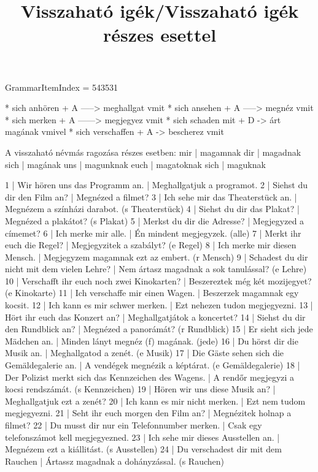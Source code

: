 \title{Visszaható igék/Visszaható igék részes esettel}

GrammarItemIndex = 543531

\begin{desc}
* sich anhören + A -----> meghallgat vmit
* sich ansehen + A -----> megnéz vmit
* sich merken + A ------> megjegyez vmit
* sich schaden mit + D -> árt magának vmivel
* sich verschaffen + A -> bescherez vmit

A visszaható névmás ragozása részes esetben:
mir  | magamnak
dir  | magadnak
sich | magának
uns  | magunknak
euch | magatoknak
sich | maguknak
\end{desc}

\begin{exmp}
1 | Wir hören uns das Programm an. | Meghallgatjuk a programot.
2 | Siehst du dir den Film an? | Megnézed a filmet?
3 | Ich sehe mir das Theaterstück an. | Megnézem a színházi darabot. (s Theaterstück)
4 | Siehst du dir das Plakat? | Megnézed a plakátot? (s Plakat)
5 | Merkst du dir die Adresse? | Megjegyzed a címemet?
6 | Ich merke mir alle. | Én mindent megjegyzek. (alle)
7 | Merkt ihr euch die Regel? | Megjegyzitek a szabályt? (e Regel)
8 | Ich merke mir diesen Mensch. | Megjegyzem magamnak ezt az embert. (r Mensch)
9 | Schadest du dir nicht mit dem vielen Lehre? | Nem ártasz magadnak a sok tanulással? (e Lehre)
10 | Verschafft ihr euch noch zwei Kinokarten? | Beszereztek még két mozijegyet? (e Kinokarte)
11 | Ich verschaffe mir einen Wagen. | Beszerzek magamnak egy kocsit.
12 | Ich kann es mir schwer merken. | Ezt nehezen tudon megjegyezni.
13 | Hört ihr euch das Konzert an? | Meghallgatjátok a koncertet?
14 | Siehst du dir den Rundblick an? | Megnézed a panorámát? (r Rundblick)
15 | Er sieht sich jede Mädchen an. | Minden lányt megnéz (f) magának. (jede)
16 | Du hörst dir die Musik an. | Meghallgatod a zenét. (e Musik)
17 | Die Gäste sehen sich die Gemäldegalerie an. | A vendégek megnézik a képtárat. (e Gemäldegalerie)
18 | Der Polizist merkt sich das Kennzeichen des Wagens. | A rendőr megjegyzi a kocsi rendszámát. (s Kennzeichen)
19 | Hören wir uns diese Musik an? | Meghallgatjuk ezt a zenét?
20 | Ich kann es mir nicht merken. | Ezt nem tudom megjegyezni.
21 | Seht ihr euch morgen den Film an? | Megnézitek holnap a filmet?
22 | Du musst dir nur ein Telefonnumber merken. | Csak egy telefonszámot kell megjegyezned.
23 | Ich sehe mir dieses Ausstellen an. | Megnézem ezt a kiállitást. (s Ausstellen)
24 | Du verschadest dir mit dem Rauchen | Ártassz magadnak a dohányzással. (s Rauchen)
\end{exmp}

